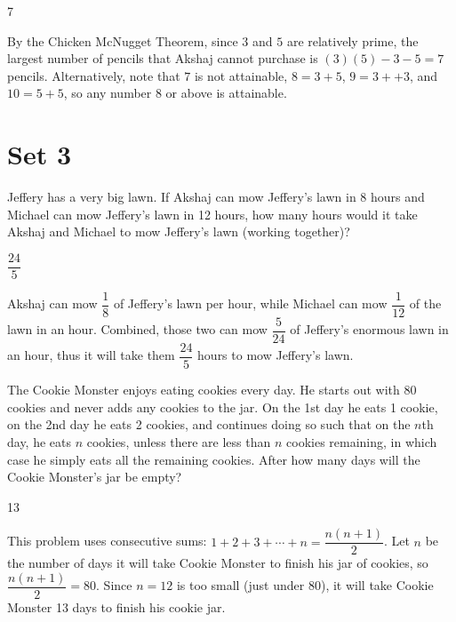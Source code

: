 \documentclass[11pt]{article}
\begin{document}
\begin{answer}
7
\end{answer}

\begin{solution}
By the Chicken McNugget Theorem, since $3$ and $5$ are relatively prime, the largest number of pencils that Akshaj cannot purchase is $(3)(5)-3-5 = 7$ pencils. Alternatively, note that $7$ is not attainable, $8 = 3+5$, $9 = 3 + + 3$, and $10 = 5 + 5$, so any number $8$ or above is attainable.
\end{solution}

\newpage

\section*{Set 3}

\begin{problem}%
Jeffery has a very big lawn. If Akshaj can mow Jeffery's lawn in 8 hours and Michael can mow Jeffery's lawn in 12 hours, how many hours would it take Akshaj and Michael to mow Jeffery's lawn (working together)?
\end{problem}

\begin{answer}
$\dfrac{24}{5}$
\end{answer}

\begin{solution}
Akshaj can mow $\dfrac{1}{8}$ of Jeffery's lawn per hour, while Michael can mow $\dfrac{1}{12}$ of the lawn in an hour. Combined, those two can mow $\dfrac{5}{24}$ of Jeffery's enormous lawn in an hour, thus it will take them $\dfrac{24}{5}$ hours to mow Jeffery's lawn.
\end{solution}


\begin{problem}%
The Cookie Monster enjoys eating cookies every day. He starts out with 80 cookies and never adds any cookies to the jar. On the 1st day he eats 1 cookie, on the 2nd day he eats 2 cookies, and continues doing so such that on the $n$th day, he eats $n$ cookies, unless there are less than $n$ cookies remaining, in which case he simply eats all the remaining cookies. After how many days will the Cookie Monster's jar be empty? 
\end{problem}

\begin{answer}
13
\end{answer}

\begin{solution}
This problem uses consecutive sums: $1+2+3+ \cdots +n = \dfrac{n(n+1)}{2}$. Let $n$ be the number of days it will take Cookie Monster to finish his jar of cookies, so $\dfrac{n(n+1)}{2} = 80$. Since $n = 12$ is too small (just under 80), it will take Cookie Monster 13 days to finish his cookie jar.
\end{solution}
\end{document}

